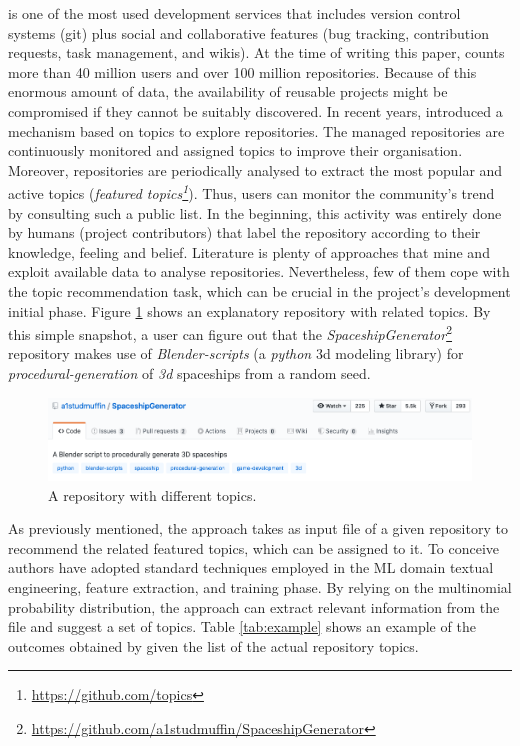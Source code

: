 \GH is one of the most used development services that includes version control 
systems (\ie git) plus social and collaborative features (\eg bug tracking, 
contribution requests, task management, and wikis).
At the time of writing this paper, \GH counts more than 40 million users and 
over 100 million repositories. Because of this enormous amount of data, the 
availability of reusable projects might be compromised if they cannot be 
suitably discovered. In recent years, \GH introduced a  mechanism based on 
topics to explore repositories. The managed \GH repositories are continuously 
monitored and assigned topics to improve their organisation. Moreover, 
repositories are periodically analysed to extract the most popular and active 
topics (\ie \emph{featured topics\footnote{\url{https://github.com/topics}}}). 
Thus, users can monitor the community's trend by consulting such a public list. 
In the beginning, this activity was entirely done by humans (\ie project 
contributors) that label the repository according to their knowledge, feeling 
and belief. Literature is plenty of approaches that mine and exploit available 
data to analyse repositories. Nevertheless, few of them cope with the topic 
recommendation task, which can be crucial in the project's development initial 
phase. Figure \ref{fig:SpaceshipGenerator} shows an explanatory repository with 
related topics. By this simple snapshot, a \GH user can figure out that the 
\emph{SpaceshipGenerator}\footnote{\label{note:spaceship}\url{https://github.com/a1studmuffin/SpaceshipGenerator}}
 repository makes use of \emph{Blender-scripts} (\ie a \emph{python} 3d 
modeling library) for \emph{procedural-generation} of \emph{3d} spaceships from 
a random seed.


\begin{figure}[h!]
    \centering
    \includegraphics[width=0.99\linewidth]{figs/SpaceshipGenerator.png}
    \caption{A \GH repository with different topics.}
    \label{fig:SpaceshipGenerator}
\end{figure}


As previously mentioned, the \MNB approach takes as input \RM file of a given 
repository to recommend the related featured topics, which can be assigned to 
it. To conceive  \MNB authors have adopted standard techniques employed in the 
ML domain \ie textual engineering, feature extraction, and training phase. By 
relying on the multinomial probability distribution, the approach can extract 
relevant information from the \RM file and suggest a set of topics. Table 
\ref{tab:example} shows an example of the outcomes obtained by \MNB given the list of the actual repository topics. 

